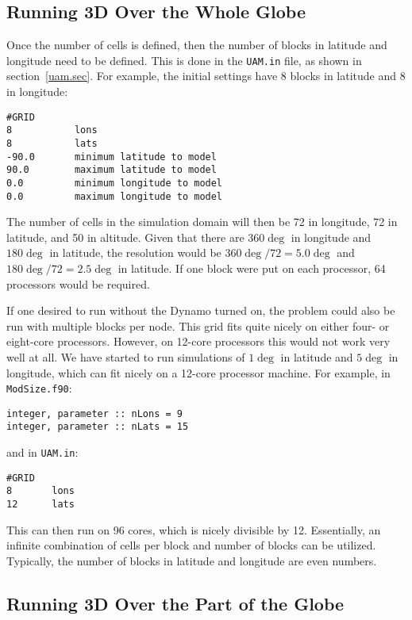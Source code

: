 \subsection{Running 3D Over the Whole Globe}

Once the number of cells is defined, then the number of blocks in latitude and longitude need to be defined.  This is done in the {\tt UAM.in} file, as shown in section~\ref{uam.sec}.  For example, the initial settings have 8 blocks in latitude and 8 in longitude:

\begin{verbatim}
#GRID
8           lons
8           lats
-90.0       minimum latitude to model
90.0        maximum latitude to model
0.0         minimum longitude to model
0.0         maximum longitude to model
\end{verbatim}

The number of cells in the simulation domain will then be 72 in longitude, 72 in latitude, and 50 in altitude.  Given that there are 360$\deg$ in longitude and $180\deg$ in latitude, the resolution would be $360\deg/72 = 5.0\deg$ and $180\deg/72 = 2.5\deg$ in latitude.  If one block were put on each processor, 64 processors would be required.

If one desired to run without the Dynamo turned on, the problem could also be run with multiple blocks per node.  This grid fits quite nicely on either four- or eight-core processors.  However, on 12-core processors this would not work very well at all.  We have started to run simulations of $1\deg$ in latitude and $5\deg$ in longitude, which can fit nicely on a 12-core processor machine.  For example, in {\tt ModSize.f90}:

\begin{verbatim}
integer, parameter :: nLons = 9
integer, parameter :: nLats = 15
\end{verbatim}

and in {\tt UAM.in}:

\begin{verbatim}
#GRID
8		lons
12		lats
\end{verbatim}

This can then run on 96 cores, which is nicely divisible by 12.  Essentially, an infinite combination of cells per block and number of blocks can be utilized.  Typically, the number of blocks in latitude and longitude are even numbers.

\subsection{Running 3D Over the Part of the Globe}

